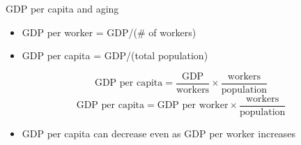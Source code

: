 \documentclass[10pt]{beamer}
\begin{document}
\begin{frame}[label={sec:org9f5dec4}]{}
\alert{GDP per capita and aging}
\begin{itemize}
\item GDP per worker = GDP/(\# of workers)
\item GDP per capita = GDP/(total population)
\end{itemize}
$$\text{GDP per capita} = \dfrac{\text{GDP}}{\text{workers}} \times \dfrac{\text{workers}}{\text{population}}$$
$$\text{GDP per capita} = \text{GDP per worker} \times \dfrac{\text{workers}}{\text{population}}$$
\begin{itemize}
\item GDP per capita can decrease even as GDP per worker increases
\end{itemize}
\end{frame}
\end{document}
